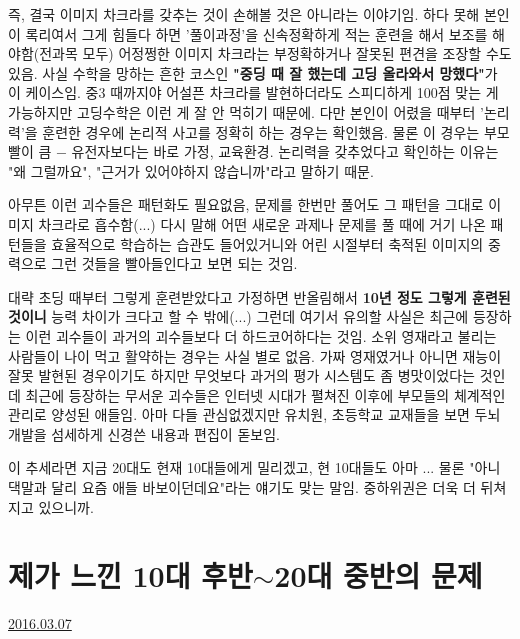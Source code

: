 즉, 결국 이미지 차크라를 갖추는 것이 손해볼 것은 아니라는 이야기임.
하다 못해 본인이 록리여서 그게 힘들다 하면 '풀이과정'을 신속정확하게 적는 훈련을 해서 보조를 해야함(전과목 모두)
어정쩡한 이미지 차크라는 부정확하거나 잘못된 편견을 조장할 수도 있음.
사실 수학을 망하는 흔한 코스인 \textbf{"중딩 때 잘 했는데 고딩 올라와서 망했다"}가 이 케이스임.
중3 때까지야 어설픈 차크라를 발현하더라도 스피디하게 100점 맞는 게 가능하지만 고딩수학은 이런 게 잘 안 먹히기 때문에.
다만 본인이 어렸을 때부터 '논리력'을 훈련한 경우에 논리적 사고를 정확히 하는 경우는 확인했음.
물론 이 경우는 부모빨이 큼 $-$ 유전자보다는 바로 가정, 교육환경.
논리력을 갖추었다고 확인하는 이유는 "왜 그럴까요", "근거가 있어야하지 않습니까"라고 말하기 때문.
\vspace{5mm}

아무튼 이런 괴수들은 패턴화도 필요없음, 문제를 한번만 풀어도 그 패턴을 그대로 이미지 차크라로 흡수함(...)
다시 말해 어떤 새로운 과제나 문제를 풀 때에 거기 나온 패턴들을 효율적으로 학습하는 습관도 들어있거니와
어린 시절부터 축적된 이미지의 중력으로 그런 것들을 빨아들인다고 보면 되는 것임.
\vspace{5mm}

대략 초딩 때부터 그렇게 훈련받았다고 가정하면 반올림해서 \textbf{10년 정도 그렇게 훈련된 것이니} 능력 차이가 크다고 할 수 밖에(...)
그런데 여기서 유의할 사실은 최근에 등장하는 이런 괴수들이 과거의 괴수들보다 더 하드코어하다는 것임.
소위 영재라고 불리는 사람들이 나이 먹고 활약하는 경우는 사실 별로 없음. 가짜 영재였거나 아니면 재능이 잘못 발현된 경우이기도 하지만
무엇보다 과거의 평가 시스템도 좀 병맛이었다는 것인데
최근에 등장하는 무서운 괴수들은 인터넷 시대가 펼쳐진 이후에 부모들의 체계적인 관리로 양성된 애들임.
아마 다들 관심없겠지만 유치원, 초등학교 교재들을 보면 두뇌개발을 섬세하게 신경쓴 내용과 편집이 돋보임.
\vspace{5mm}

이 추세라면 지금 20대도 현재 10대들에게 밀리겠고, 현 10대들도 아마 ...
물론 "아니 댁말과 달리 요즘 애들 바보이던데요"라는 얘기도 맞는 말임. 중하위권은 더욱 더 뒤쳐지고 있으니까.
\vspace{5mm}







\section{제가 느낀 10대 후반$\sim$20대 중반의 문제}
\href{https://www.kockoc.com/Apoc/666852}{2016.03.07}

